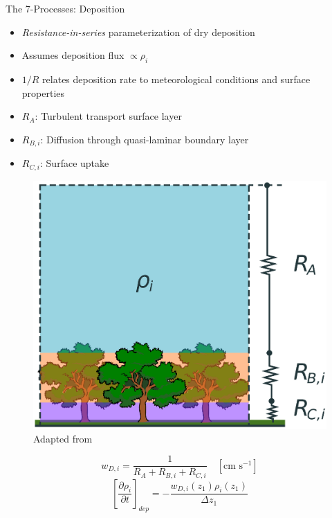 \documentclass[10pt]{beamer}
\begin{document}
\begin{frame}[fragile]{The 7-Processes: Deposition}
        \begin{minipage}[c]{0.49\textwidth}
        \small
        \begin{itemize}
            \item \textit{Resistance-in-series} parameterization of dry deposition
            \item Assumes deposition flux $\propto \rho_i$
            \item $1/R$ relates deposition rate to meteorological conditions and surface properties
            \item $R_A$: Turbulent transport surface layer
            \item $R_{B,i}$: Diffusion through quasi-laminar boundary layer
            \item $R_{C,i}$: Surface uptake
        \end{itemize}
    \end{minipage} \hfill
    \begin{minipage}[c]{0.5\textwidth}
    \begin{figure}
        \centering
        \includegraphics[width=\textwidth]{box-model-dep.eps}    
        \captionsetup{labelformat=empty}
        \caption{Adapted from \cite{brasseur_modeling_2017}}
    \end{figure}
    $$
        w_{D,i} = \frac{1}{R_A + R_{B,i} + R_{C,i}} \quad [\text{cm s}^{-1}]
    $$ 
    \vspace{0.1cm}
    $$
        \left[ \frac{\partial \rho_i}{\partial t} \right]_{dep} = - \frac{w_{D,i}(z_1) \rho_i(z_1)}{\Delta z_1} 
    $$
    \end{minipage}
\end{frame}
\end{document}
